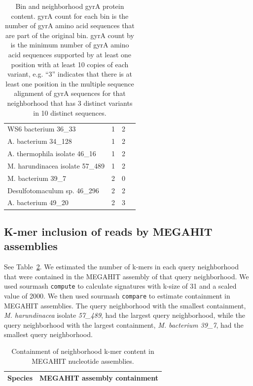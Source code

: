 \begin{table}
{\begin{tabular}{@{}l l c c @{}}
    WS6 bacterium 36\_33 & 1 & 2 \\
    A. bacterium 34\_128 & 1 & 2 \\
    A. thermophila isolate 46\_16 & 1 & 2 \\
    M. harundinacea isolate 57\_489 & 1 & 2 \\
    M. bacterium 39\_7 & 2 & 0 \\
    Desulfotomaculum sp. 46\_296 & 2 & 2 \\
    A. bacterium 49\_20 & 2 & 3 \\
    \bottomrule
  \end{tabular}
  \caption{  \label{tab:gyrAcounts}%
   Bin and neighborhood gyrA protein content. gyrA count for each bin is the number
    of gyrA amino acid sequences that are part of the original bin. gyrA count by \plass is
    the minimum number of gyrA amino acid sequences supported by at least one
    position with at least 10 copies of each variant, e.g. ``3'' indicates that
    there is at least one position in the multiple sequence alignment of gyrA
    sequences for that neighborhood that has 3 distinct variants in 10 distinct
    sequences.}
  }
\end{table}

\subsection{K-mer inclusion of reads by MEGAHIT assemblies}
\label{subsec:inclusion}

See Table~\ref{tab:kmer_inclusion}. We estimated the number of k-mers in each
query neighborhood that were contained in the MEGAHIT assembly of that query
neighborhood. We used sourmash {\tt compute} to calculate signatures with k-size of
31 and a scaled value of 2000. We then used sourmash {\tt compare} to estimate
containment in MEGAHIT assemblies. The query neighborhood with the smallest
containment, \emph{M. harundinacea} isolate \emph{57\_489}, had the largest query
neighborhood, while the query neighborhood with the largest containment,
\emph{M. bacterium 39\_7}, had the smallest query neighborhood.

\begin{table}
  \begin{tabular}{l c}
    \toprule
    Species & MEGAHIT assembly containment \\
    \midrule
    
%    
    \bottomrule
  \end{tabular}
  \caption{Containment of neighborhood k-mer content in MEGAHIT nucleotide assemblies.}
  \label{tab:kmer_inclusion}
\end{table}

